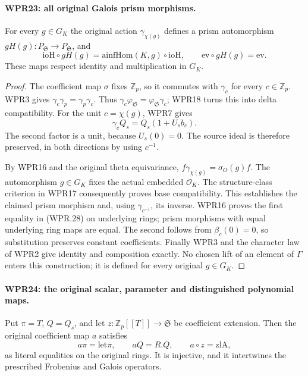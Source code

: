 \paragraph{WPR23: all original Galois prism morphisms.}
\label{claim:WPR23}
For every $g\in G_K$ the original action
$\gamma_{\chi(g)}$ defines a prism automorphism
$gH(g):P_{\mathfrak S}\to P_{\mathfrak S}$, and
\[
 \mathrm{ioH}\circ gH(g)=\mathrm{ainfHom}(K,g)\circ\mathrm{ioH},
 \qquad \mathrm{ev}\circ gH(g)=\mathrm{ev}.
 \tag{WPR.28}
\]
These maps respect identity and multiplication in $G_K$.

\begin{proof}
The coefficient map $\sigma$ fixes $\mathbb Z_p$, so it commutes
with $\gamma_c$ for every $c\in\mathbb Z_p$. WPR3 gives
$\gamma_c\gamma_p=\gamma_p\gamma_c$. Thus
$\gamma_c\varphi_{\mathfrak S}=\varphi_{\mathfrak S}\gamma_c$;
WPR18 turns this into delta compatibility. For the unit
$c=\chi(g)$, WPR7 gives
\[
              \gamma_c Q_s=Q_s(1+U_s b_c).
\]
The second factor is a unit, because $U_s(0)=0$. The source
ideal is therefore preserved, in both directions by using
$c^{-1}$.

By WPR16 and the original theta equivariance,
$f\gamma_{\chi(g)}=\sigma_O(g)f$. The automorphism $g\in G_K$
fixes the actual embedded $\mathcal O_K$. The structure-class
criterion in WPR17 consequently proves base compatibility.
This establishes the claimed prism morphism and, using
$\gamma_{c^{-1}}$, its inverse. WPR16 proves the first equality
in (WPR.28) on underlying rings; prism morphisms with equal
underlying ring maps are equal. The second follows from
$\beta_c(0)=0$, so substitution preserves constant coefficients.
Finally WPR3 and the character law of WPR2 give identity and
composition exactly. No chosen lift of an element of $\Gamma$
enters this construction; it is defined for every original
$g\in G_K$.
\end{proof}

\paragraph{WPR24: the original scalar, parameter and distinguished polynomial maps.}
\label{claim:WPR24}
Put $\pi=T$, $Q=Q_s$, and let
$z:\mathbb Z_p[[T]]\to\mathfrak S$ be coefficient extension.
Then the original coefficient map $a$ satisfies
\[
 a\pi=\mathrm{let}\pi,\qquad aQ=R.Q,\qquad
 a\circ z=\mathrm{zlA},
 \tag{WPR.29}
\]
as literal equalities on the original rings. It is injective,
and it intertwines the prescribed Frobenius and Galois operators.

